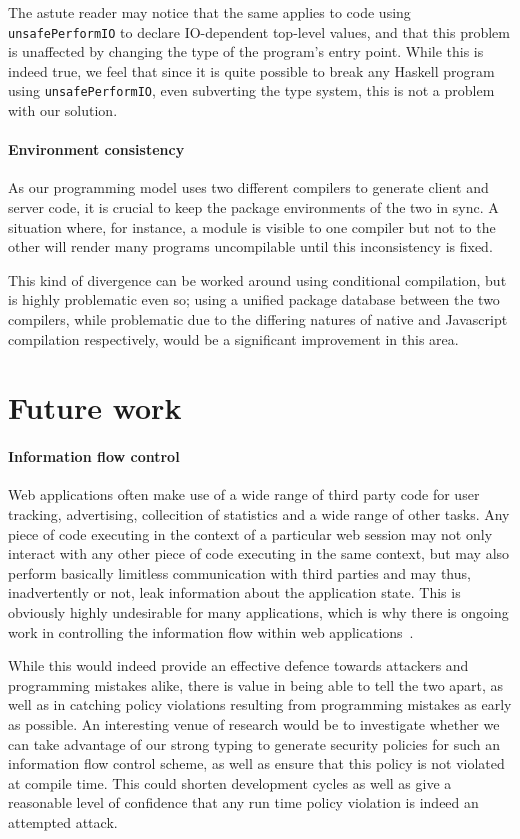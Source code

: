 \documentclass[preprint]{sigplanconf}
\begin{document}
The astute reader may notice that the same applies to code using
\lstinline!unsafePerformIO! to declare IO-dependent top-level values, and that
this problem is unaffected by changing the type of the program's entry point.
While this is indeed true, we feel that since it is quite possible to break
any Haskell program using \lstinline!unsafePerformIO!, even subverting the type
system, this is not a problem with our solution.

\paragraph{Environment consistency} As our programming model uses two different
compilers to generate client and server code, it is crucial to keep the package
environments of the two in sync. A situation where, for instance, a module is
visible to one compiler but not to the other will render many programs
uncompilable until this inconsistency is fixed.

This kind of divergence can be worked around using conditional compilation, but
is highly problematic even so; using a unified package database between the two
compilers, while problematic due to the differing natures of native and
Javascript compilation respectively, would be a significant improvement in this
area.

\section{Future work}

\paragraph{Information flow control} Web applications often make use of a wide
range of third party code for user tracking, advertising, collecition of
statistics and a wide range of other tasks. Any piece of code executing in the
context of a particular web session may not only interact with any other piece
of code executing in the same context, but may also perform basically limitless
communication with third parties and may thus, inadvertently or not, leak
information about the application state. This is obviously highly undesirable
for many applications, which is why there is ongoing work in controlling the
information flow within web applications\ \cite{jsflow}.

While this would indeed provide an effective defence towards attackers and
programming mistakes alike, there is value in being able to tell the two apart,
as well as in catching policy violations resulting from programming mistakes
as early as possible. An interesting venue of research would be to investigate
whether we can take advantage of our strong typing to generate security policies
for such an information flow control scheme, as well as ensure that this policy
is not violated at compile time. This could shorten development cycles as well
as give a reasonable level of confidence that any run time policy violation is
indeed an attempted attack.
\end{document}
